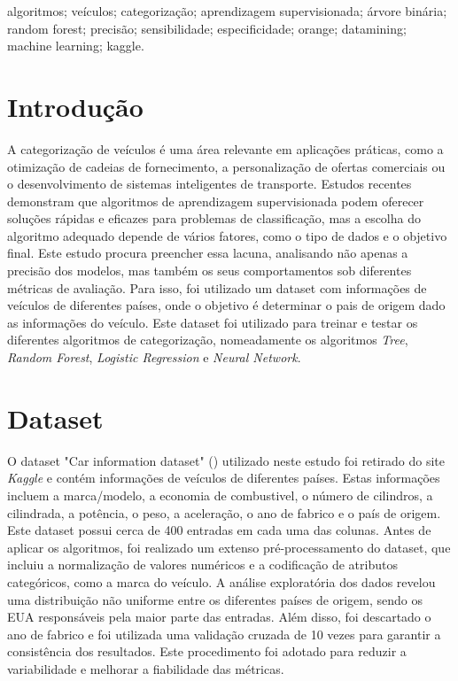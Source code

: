 \documentclass[conference]{IEEEtran}
\begin{document}
\begin{IEEEkeywords}
	algoritmos; veículos; categorização; aprendizagem supervisionada; árvore binária; random forest; precisão; sensibilidade; especificidade;
	orange; datamining; machine learning; kaggle.
\end{IEEEkeywords}

\section{Introdução}
A categorização de veículos é uma área relevante em aplicações práticas, como a otimização de cadeias de fornecimento, a personalização
de ofertas comerciais ou o desenvolvimento de sistemas inteligentes de transporte. Estudos recentes demonstram que algoritmos de
aprendizagem supervisionada podem oferecer soluções rápidas e eficazes para problemas de classificação, mas a escolha do algoritmo
adequado depende de vários fatores, como o tipo de dados e o objetivo final. Este estudo procura preencher essa lacuna, analisando não
apenas a precisão dos modelos, mas também os seus comportamentos sob diferentes métricas de avaliação. Para isso, foi utilizado um
dataset com informações de veículos de diferentes países, onde o objetivo é determinar o pais de origem dado as informações do veículo.
Este dataset foi utilizado para treinar e testar os diferentes algoritmos de categorização, nomeadamente os algoritmos \textit{Tree},
\textit{Random Forest}, \textit{Logistic Regression} e \textit{Neural Network}.

\section{Dataset}
O dataset "Car information dataset" (\cite{ref1}) utilizado neste estudo foi retirado do site \textit{Kaggle} e contém informações de
veículos de diferentes países. Estas informações incluem a marca/modelo, a economia de combustivel, o número de cilindros, a cilindrada,
a potência, o peso, a aceleração, o ano de fabrico e o país de origem. Este dataset possui cerca de 400 entradas em cada uma das colunas.
Antes de aplicar os algoritmos, foi realizado um extenso pré-processamento do dataset, que incluiu a normalização de valores numéricos
e a codificação de atributos categóricos, como a marca do veículo. A análise exploratória dos dados revelou uma distribuição não uniforme
entre os diferentes países de origem, sendo os EUA responsáveis pela maior parte das entradas. Além disso, foi descartado o ano de fabrico
e foi utilizada uma validação cruzada de 10 vezes para garantir a consistência dos resultados. Este procedimento foi adotado para reduzir
a variabilidade e melhorar a fiabilidade das métricas.
\end{document}
